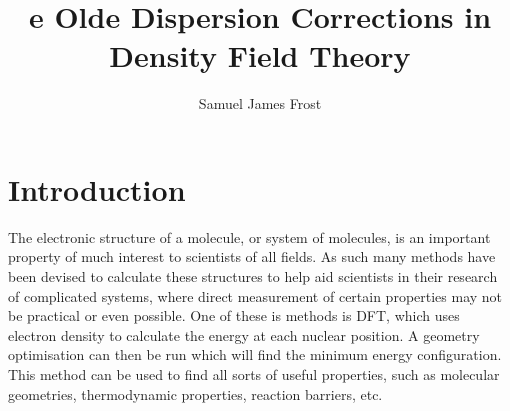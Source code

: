 \documentclass[10pt,a4paper,twocolumn,twoside]{extarticle}
\title{{\TH}e Olde Dispersion Corrections in Density Field Theory}
\author{Samuel James Frost}
\begin{document}
	\thispagestyle{empty}
	\twocolumn[
	\begin{@twocolumnfalse}
		\begin{center}
			\vspace*{-10mm}
			{\Large\scshape\papertitle}\\
			\vspace{2ex}
			{\itshape\paperauthor}
		\end{center}
		\centering\noindent\rule{0.9\textwidth}{0.4pt}
		\begin{abstract}
			{\lipsum[5]}
		\end{abstract}
		\centering\noindent\rule{0.9\textwidth}{0.4pt}\\
		\vspace{1cm}
	\end{@twocolumnfalse}]
	\tableofcontents

	
	\section{Introduction}
	The electronic structure of a molecule, or system of molecules, is an important property of much interest to scientists of all fields. As such many methods have been devised to calculate these structures to help aid scientists in their research of complicated systems, where direct measurement of certain properties may not be practical or even possible. One of these is methods is DFT, which uses electron density to calculate the energy at each nuclear position. A geometry optimisation can then be run which will find the minimum energy configuration. \cite{Parr1989} This method can be used to find all sorts of useful properties, such as molecular geometries, thermodynamic properties, reaction barriers, etc.\cite{Jones2015}
\end{document}
